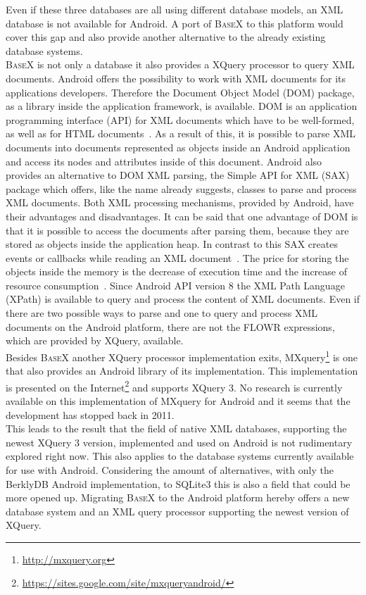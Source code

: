 Even if these three databases are all using different database models, an XML database is not available for Android. 
A port of \textsc{BaseX} to this platform would cover this gap and also provide another alternative to the already existing database systems.\\
\textsc{BaseX} is not only a database it also provides a XQuery processor to query XML documents.
Android offers the possibility to work with XML documents for its applications developers.
Therefore the Document Object Model (DOM) package, as a library inside the application framework, is available.
DOM is an application programming interface (API) for XML documents which have to be well-formed, as well as for HTML documents~\cite{nicol2001document}.
As a result of this, it is possible to parse XML documents into documents represented as objects inside an Android application and access its nodes and attributes inside of this document.
Android also provides an alternative to DOM XML parsing, the Simple API for XML (SAX) package which offers, like the name already suggests, classes to parse and process XML documents.
Both XML processing mechanisms, provided by Android, have their advantages and disadvantages.
It can be said that one advantage of DOM is that it is possible to access the documents after parsing them, because they are stored as objects inside the application heap.
In contrast to this SAX creates events or callbacks while reading an XML document~\cite{roy2001xml}.
The price for storing the objects inside the memory is the decrease of execution time and the increase of resource consumption~\cite{chenextracting}.
Since Android API version 8 the XML Path Language (XPath) is available to query and process the content of XML documents.
Even if there are two possible ways to parse and one to query and process XML documents on the Android platform, there are not the FLOWR expressions, which are provided by XQuery, available.\\
Besides \textsc{BaseX} another XQuery processor implementation exits, MXquery\footnote{\url{http://mxquery.org}} is one that also provides an Android library of its implementation.
This implementation is presented on the Internet\footnote{\url{https://sites.google.com/site/mxqueryandroid/}} and supports XQuery 3.
No research is currently available on this implementation of MXquery for Android and it seems that the development has stopped back in 2011.\\
This leads to the result that the field of native XML databases, supporting the newest XQuery 3 version, implemented and used on Android is not rudimentary explored right now.
This also applies to the database systems currently available for use with Android.
Considering the amount of alternatives, with only the BerklyDB Android implementation, to SQLite3 this is also a field that could be more opened up.
Migrating \textsc{BaseX} to the Android platform hereby offers a new database system and an XML query processor supporting the newest version of XQuery.

